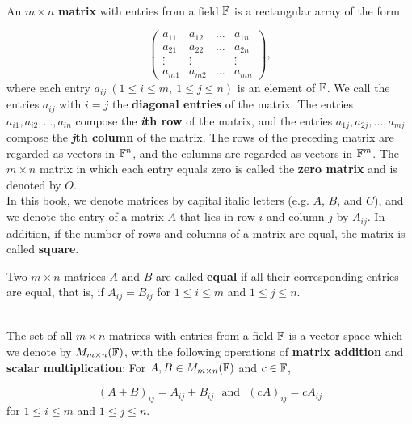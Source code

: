 \begin{definition}
	\hfill\\
	An $m \times n$ \textbf{matrix} with entries from a field $\mathbb{F}$ is a rectangular array of the form
	
	\[\begin{pmatrix}
		a_{11} & a_{12} & \dots &a_{1n} \\
		a_{21} & a_{22} & \dots & a_{2n} \\
		\vdots & \vdots & & \vdots \\
		a_{m1} & a_{m2} & \dots & a_{mn}
	\end{pmatrix},\]
	where each entry $a_{ij}\ (1 \leq i \leq m,\ 1 \leq j \leq n)$ is an element of $\mathbb{F}$. We call the entries $a_{ij}$ with $i=j$ the \textbf{diagonal entries} of the matrix. The entries $a_{i1}, a_{i2}, \dots, a_{in}$ compose the \textbf{\textit{i}th row}  of the matrix, and the entries $a_{1j}, a_{2j}, \dots, a_{mj}$ compose the \textbf{\textit{j}th column} of the matrix. The rows of the preceding matrix are regarded as vectors in $\mathbb{F}^n$, and the columns are regarded as vectors in $\mathbb{F}^m$. The $m \times n$ matrix in which each entry equals zero is called the \textbf{zero matrix} and is denoted by $O$.\\
	
	In this book, we denote matrices by capital italic letters (e.g. $A$, $B$, and $C$), and we denote the entry of a matrix $A$ that lies in row $i$ and column $j$ by $A_{ij}$. In addition, if the number of rows and columns of a matrix are equal, the matrix is called \textbf{square}.
	
	Two $m \times n$ matrices $A$ and $B$ are called \textbf{equal} if all their corresponding entries are equal, that is, if $A_{ij} = B_{ij}$ for $1 \leq i \leq m$ and $1 \leq j \leq n$.
\end{definition}

\begin{definition}
	\hfill\\
	The set of all $m \times n$ matrices with entries from a field $\mathbb{F}$ is a vector space which we denote by $M_{m \times n}(\mathbb{F})$, with the following operations of \textbf{matrix addition} and \textbf{scalar multiplication}: For $A, B \in M_{m \times n}(\mathbb{F})$ and $c \in \mathbb{F}$,
	
	\[(A + B)_{ij} = A_{ij} + B_{ij}\ \ \ \text{and}\ \ \  (cA)_{ij} = cA_{ij}\]
	for $1 \leq i \leq m$ and $1 \leq j \leq n$.
\end{definition}

